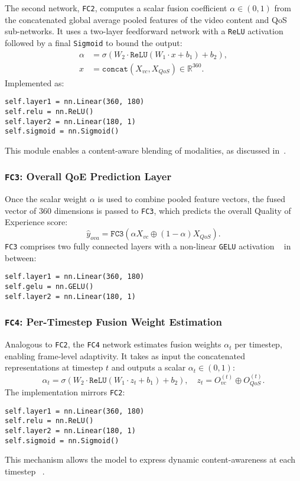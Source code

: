 The second network, \texttt{FC2}, computes a scalar fusion coefficient $\alpha \in (0,1)$ from the concatenated global average pooled features of the video content and QoS sub-networks. It uses a two-layer feedforward network with a \texttt{ReLU} activation followed by a final \texttt{Sigmoid} to bound the output:
\begin{align}
    \alpha &= \sigma\left( W_2 \cdot \texttt{ReLU}(W_1 \cdot x + b_1) + b_2 \right), \\
    x &= \texttt{concat}(X_{vc}, X_{QoS}) \in \mathbb{R}^{360}.
\end{align}
Implemented as:
\begin{verbatim}
self.layer1 = nn.Linear(360, 180)
self.relu = nn.ReLU()
self.layer2 = nn.Linear(180, 1)
self.sigmoid = nn.Sigmoid()
\end{verbatim}
This module enables a content-aware blending of modalities, as discussed in~\cite{jia2024continuous}.

\subsubsection*{\texttt{FC3}: Overall QoE Prediction Layer}

Once the scalar weight $\alpha$ is used to combine pooled feature vectors, the fused vector of 360 dimensions is passed to \texttt{FC3}, which predicts the overall Quality of Experience score:
\begin{equation}
    \hat{y}_{ova} = \texttt{FC3}(\alpha X_{vc} \oplus (1 - \alpha) X_{QoS}).
\end{equation}
\texttt{FC3} comprises two fully connected layers with a non-linear \texttt{GELU} activation ~\cite{hendrycks2016gaussian} in between:
\begin{verbatim}
self.layer1 = nn.Linear(360, 180)
self.gelu = nn.GELU()
self.layer2 = nn.Linear(180, 1)
\end{verbatim}

\subsubsection*{\texttt{FC4}: Per-Timestep Fusion Weight Estimation}

Analogous to \texttt{FC2}, the \texttt{FC4} network estimates fusion weights $\alpha_t$ per timestep, enabling frame-level adaptivity. It takes as input the concatenated representations at timestep $t$ and outputs a scalar $\alpha_t \in (0,1)$:
\begin{equation}
    \alpha_t = \sigma\left( W_2 \cdot \texttt{ReLU}(W_1 \cdot z_t + b_1) + b_2 \right), \quad z_t = O_{vc}^{(t)} \oplus O_{QoS}^{(t)}.
\end{equation}
The implementation mirrors \texttt{FC2}:
\begin{verbatim}
self.layer1 = nn.Linear(360, 180)
self.relu = nn.ReLU()
self.layer2 = nn.Linear(180, 1)
self.sigmoid = nn.Sigmoid()
\end{verbatim}
This mechanism allows the model to express dynamic content-awareness at each timestep ~\cite{jia2024continuous}.

